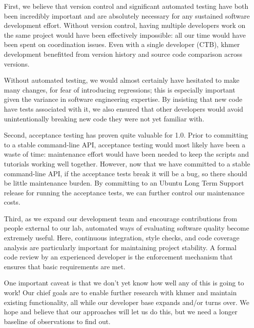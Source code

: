 \documentclass[11pt]{article}
\begin{document}
First, we believe that version control and significant automated
testing have both been incredibly important and are absolutely
necessary for any sustained software development effort.  Without
version control, having multiple developers work on the same project
would have been effectively impossible: all our time would have been
spent on coordination issues.  Even with a single developer (CTB),
khmer development benefitted from version history and source code
comparison across versions.

Without automated testing, we would almost certainly have hesitated to
make many changes, for fear of introducing regressions; this is
especially important given the variance in software engineering
expertise.  By insisting that new code have tests associated with it,
we also ensured that other developers would avoid unintentionally breaking
new code they were not yet familiar with.

Second, acceptance testing has proven quite valuable for 1.0.  Prior
to committing to a stable command-line API, acceptance testing would
most likely have been a waste of time: maintenance effort would have
been needed to keep the scripts and tutorials working well together.
However, now that we have committed to a stable command-line API, if
the acceptance tests break it will be a bug, so there should be little
maintenance burden.  By committing to an Ubuntu Long Term Support
release for running the acceptance tests, we can further control our
maintenance costs.

Third, as we expand our development team and encourage contributions
from people external to our lab, automated ways of evaluating software
quality become extremely useful.  Here, continuous integration, style
checks, and code coverage analysis are particularly important for
maintaining project stability.  A formal code review by an experienced
developer is the enforcement mechanism that ensures that basic requirements
are met.

One important caveat is that we don't yet know how well any of this is
going to work!  Our chief goals are to enable further research with
khmer and maintain existing functionality, all while our
developer base expands and/or turns over. We hope and believe that our
approaches will let us do this, but we need a longer baseline of
observations to find out.


\end{document}
